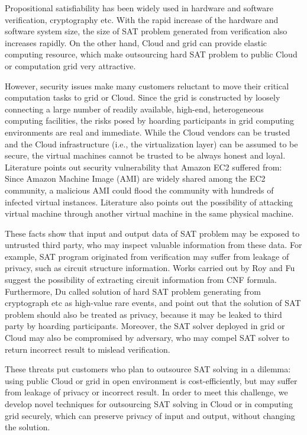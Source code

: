 
\begin{eabstract}
Propositional satisfiability\cite{SATtheory} has been widely used in hardware and software verification\cite{HardwareSAT,softwareSAT},
cryptography\cite{cryptoSAT} etc.
With the rapid increase of the hardware and software system size,
the size of SAT problem generated from verification  also increases rapidly.
On the other hand, Cloud and grid can provide elastic computing resource,
which make outsourcing hard SAT problem to public Cloud or computation grid\cite{Nordugrid,CloudSMT,OneSpin} very attractive.

However, security issues make many customers reluctant to move their critical computation tasks to grid or Cloud.
Since the grid is constructed by loosely connecting a large number of readily available, high-end, heterogeneous computing facilities\cite{Nordugrid},
the risks posed by hoarding participants in grid computing environments are real and immediate\cite{HV-grid}.
While the Cloud vendors can be trusted and the Cloud infrastructure (i.e., the virtualization layer) can be assumed to be secure,
the virtual machines cannot be trusted to be always honest and loyal.
Literature\cite{AMI} points out security vulnerability that Amazon EC2 suffered from:
Since Amazon Machine Image (AMI) are widely shared among the EC2 community,
a malicious AMI could flood the community with hundreds of infected virtual instances.
Literature \cite{InformationLeakageofCloud} also points out
the possibility of attacking virtual machine
through another virtual machine in the same physical machine.

These facts show that input and output data of SAT problem may be exposed to untrusted third party,
who may inspect valuable information from these data.
For example, SAT program originated from verification may suffer from leakage of privacy, such as circuit structure information.
Works carried out by Roy\cite{csRoy} and Fu \cite{csFu} suggest the possibility of extracting circuit information from CNF formula.
Furthermore, Du\cite{HV-grid} called solution of hard SAT problem generating from cryptograph etc as high-value rare events,
and point out that the solution of SAT problem should also be treated as privacy,
because it may be leaked to third party by hoarding participants.
Moreover, the SAT solver deployed in grid or Cloud may also be compromised by adversary,
who may compel SAT solver to return incorrect result to  mislead verification.

These threats put customers who plan to outsource SAT solving in a dilemma:
using public Cloud or grid in open environment is cost-efficiently,
but may suffer from leakage of privacy or incorrect result.
In order to meet this challenge, we develop novel techniques for outsourcing SAT solving in Cloud or in computing grid securely,
which can preserve privacy of input and output, without changing the solution.

\end{eabstract}


